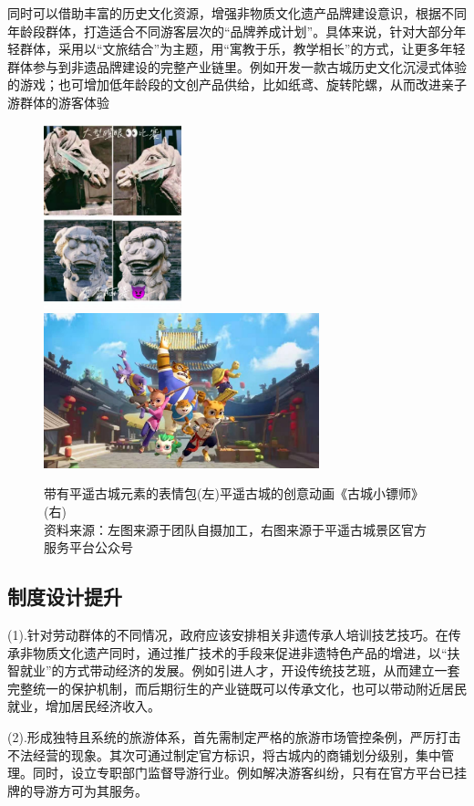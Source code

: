 \documentclass[UTF8]{ctexart}
\begin{document}
            同时可以借助丰富的历史文化资源，增强非物质文化遗产品牌建设意识，根据不同年龄段群体，打造适合不同游客层次的“品牌养成计划”。具体来说，针对大部分年轻群体，采用以“文旅结合”为主题，用“寓教于乐，教学相长”的方式，让更多年轻群体参与到非遗品牌建设的完整产业链里。例如开发一款古城历史文化沉浸式体验的游戏；也可增加低年龄段的文创产品供给，比如纸鸢、旋转陀螺，从而改进亲子游群体的游客体验
            \begin{figure}[H]
                \centering
                \includegraphics[width=4cm]{表情包.jpg}
                \includegraphics[width=8cm]{古城小镖师.jpg}
                \caption[plain]{带有平遥古城元素的表情包(左)平遥古城的创意动画《古城小镖师》(右)\\资料来源：左图来源于团队自摄加工，右图来源于平遥古城景区官方服务平台公众号}
                \label{fig:my_label}
            \end{figure}
    \subsection{制度设计提升}
    (1).针对劳动群体的不同情况，政府应该安排相关非遗传承人培训技艺技巧。在传承非物质文化遗产同时，通过推广技术的手段来促进非遗特色产品的增进，以“扶智就业”的方式带动经济的发展。例如引进人才，开设传统技艺班，从而建立一套完整统一的保护机制，而后期衍生的产业链既可以传承文化，也可以带动附近居民就业，增加居民经济收入。
    
    (2).形成独特且系统的旅游体系，首先需制定严格的旅游市场管控条例，严厉打击不法经营的现象。其次可通过制定官方标识，将古城内的商铺划分级别，集中管理。同时，设立专职部门监督导游行业。例如解决游客纠纷，只有在官方平台已挂牌的导游方可为其服务。
    
\end{document}
